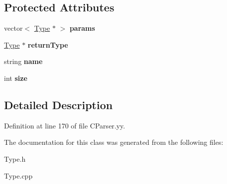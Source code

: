 \subsection*{Protected Attributes}
\begin{DoxyCompactItemize}
\item 
\hypertarget{classFunctionType_ac0b64fb3a71049d0b25ee5acae8812d2}{vector$<$ \hyperlink{classType}{Type} $\ast$ $>$ {\bfseries params}}\label{classFunctionType_ac0b64fb3a71049d0b25ee5acae8812d2}

\item 
\hypertarget{classFunctionType_a26392c88eef9c9245a0f5b3deca275f0}{\hyperlink{classType}{Type} $\ast$ {\bfseries return\-Type}}\label{classFunctionType_a26392c88eef9c9245a0f5b3deca275f0}

\item 
\hypertarget{classType_ad7eeefba3dfcecbdaa98d46aaa84e389}{string {\bfseries name}}\label{classType_ad7eeefba3dfcecbdaa98d46aaa84e389}

\item 
\hypertarget{classType_a871302dc63ac1a37c0b6a225cf82048d}{int {\bfseries size}}\label{classType_a871302dc63ac1a37c0b6a225cf82048d}

\end{DoxyCompactItemize}


\subsection{Detailed Description}


Definition at line 170 of file C\-Parser.\-yy.



The documentation for this class was generated from the following files\-:\begin{DoxyCompactItemize}
\item 
Type.\-h\item 
Type.\-cpp\end{DoxyCompactItemize}
